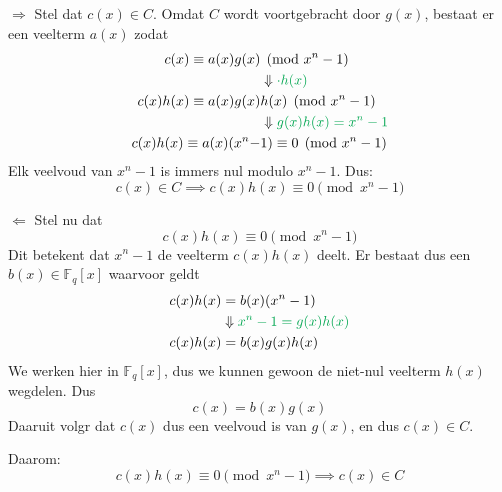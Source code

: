 $\boxed{\Rightarrow}$ Stel dat $c(x) \in C$. Omdat $C$ wordt voortgebracht door $g(x)$, bestaat er een veelterm $a(x)$ zodat
\begin{equation*}
    \begin{aligned}
        c(x) \equiv a(x)g(x) &\pmod {x^n-1} \\
        &\Downarrow \textcolor{Green}{\cdot h(x)} \\
        c(x)h(x) \equiv a(x)g(x)&h(x) \pmod {x^n-1} \\
        &\Downarrow \textcolor{Green}{g(x)h(x) = x^n-1} \\
        c(x)h(x) \equiv a(x)(x^n-&1)\equiv 0 \pmod {x^n-1}
    \end{aligned}
\end{equation*}
Elk veelvoud van $x^n-1$ is immers nul modulo $x^n-1$. Dus:
\begin{equation*}
    c(x) \in C \implies c(x)h(x) \equiv 0 \pmod {x^n-1}
\end{equation*}

$\boxed{\Leftarrow}$ Stel nu dat 
\begin{equation*}
    c(x)h(x) \equiv 0 \pmod {x^n-1}
\end{equation*}
Dit betekent dat $x^n-1$ de veelterm $c(x)h(x)$ deelt. Er bestaat dus een $b(x) \in \mathbb{F}_q\left[x\right]$ waarvoor geldt
\begin{equation*}
    \begin{aligned}
        c(x)h(x) &= b(x)(x^n-1) \\
        &\Downarrow \textcolor{Green}{x^n-1 = g(x)h(x)} \\
        c(x)h(x) &= b(x)g(x)h(x) \\
    \end{aligned}
\end{equation*}
We werken hier in $\mathbb{F}_q\left[x\right]$, dus we kunnen gewoon de niet-nul veelterm $h(x)$ wegdelen. Dus
\begin{equation*}
    c(x) = b(x)g(x)
\end{equation*}
Daaruit volgr dat $c(x)$ dus een veelvoud is van $g(x)$, en dus $c(x) \in C$.

Daarom:
\begin{equation*}
    c(x)h(x) \equiv 0 \pmod {x^n-1} \implies c(x) \in C
\end{equation*}

